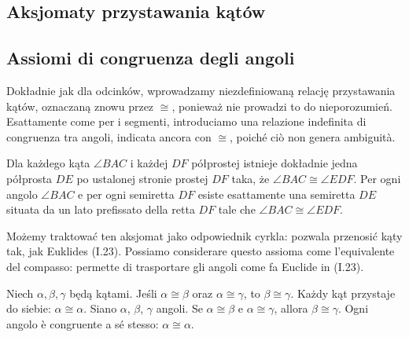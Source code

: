 
%

\subsection{Aksjomaty przystawania kątów} %
\subsection{Assiomi di congruenza degli angoli} %

Dokładnie jak dla odcinków, wprowadzamy niezdefiniowaną relację przystawania kątów, oznaczaną znowu przez $\cong$, ponieważ nie prowadzi to do nieporozumień. %
Esattamente come per i segmenti, introduciamo una relazione indefinita di congruenza tra angoli, indicata ancora con $\cong$, poiché ciò non genera ambiguità. %

\begin{axiom}
[przystawania, C4] %
[di congruenza, C4] %
    Dla każdego kąta $\angle BAC$ i każdej $DF$ półprostej istnieje dokładnie jedna półprosta $DE$ po ustalonej stronie prostej $DF$ taka, że $\angle BAC \cong \angle EDF$. %
    Per ogni angolo $\angle BAC$ e per ogni semiretta $DF$ esiste esattamente una semiretta $DE$ situata da un lato prefissato della retta $DF$ tale che $\angle BAC \cong \angle EDF$. %
\end{axiom}

Możemy traktować ten aksjomat jako odpowiednik cyrkla: pozwala przenosić kąty tak, jak Euklides (I.23). %
Possiamo considerare questo assioma come l'equivalente del compasso: permette di trasportare gli angoli come fa Euclide in (I.23). %

\begin{axiom}
[przystawania, C5] %
[di congruenza, C5] %
    Niech $\alpha, \beta, \gamma$ będą kątami. %
    Jeśli $\alpha \cong \beta$ oraz $\alpha \cong \gamma$, to $\beta \cong \gamma$. %
    Każdy kąt przystaje do siebie: $\alpha \cong \alpha$. %
    Siano $\alpha$, $\beta$, $\gamma$ angoli. %
    Se $\alpha \cong \beta$ e $\alpha \cong \gamma$, allora $\beta \cong \gamma$. %
    Ogni angolo è congruente a sé stesso: $\alpha \cong \alpha$. %
\end{axiom}

